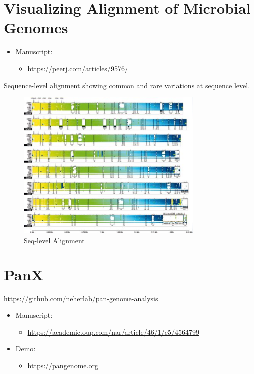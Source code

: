\documentclass[
]{book}
\providecommand{\tightlist}{%
  \setlength{\itemsep}{0pt}\setlength{\parskip}{0pt}}
\begin{document}
\hypertarget{visualizing-alignment-of-microbial-genomes}{%
\section{Visualizing Alignment of Microbial Genomes}\label{visualizing-alignment-of-microbial-genomes}}

\begin{itemize}
\tightlist
\item
  Manuscript:

  \begin{itemize}
  \tightlist
  \item
    \url{https://peerj.com/articles/9576/}
  \end{itemize}
\end{itemize}

Sequence-level alignment showing common and rare variations at sequence level.

\begin{figure}
\centering
\includegraphics[width=0.8\textwidth,height=\textheight]{./Figures/MicrobialSeqAlign.png}
\caption{Seq-level Alignment}
\end{figure}

\hypertarget{panx}{%
\section{PanX}\label{panx}}

\url{https://github.com/neherlab/pan-genome-analysis}

\begin{itemize}
\tightlist
\item
  Manuscript:

  \begin{itemize}
  \tightlist
  \item
    \url{https://academic.oup.com/nar/article/46/1/e5/4564799}
  \end{itemize}
\item
  Demo:

  \begin{itemize}
  \tightlist
  \item
    \url{https://pangenome.org}
  \end{itemize}
\end{itemize}
\end{document}
